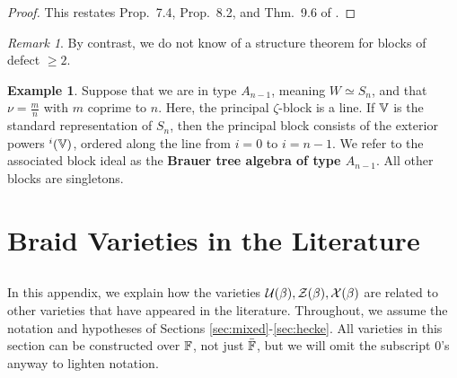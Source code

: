 \documentclass[a4paper,10pt,leqno]{amsart}
\theoremstyle{plain}
\theoremstyle{plain}
\theoremstyle{plain}
\theoremstyle{definition}
\newtheorem{ex}[thm]{Example}
\theoremstyle{remark}
\newtheorem{rem}[thm]{Remark}
\newcommand{\dfemph}[1]{\textbf{#1}}
\let\Alt\relax
\DeclareMathOperator{\Alt}{\text{$\Lambda$}}
\newcommand{\slope}{\nu}
\begin{document}
\begin{proof}
This restates Prop.~7.4, Prop.~8.2, and Thm.~9.6 of \cite{geck}.
\end{proof}

\begin{rem}
By contrast, we do not know of a structure theorem for blocks of defect $\geq 2$.
\end{rem}

\begin{ex}
Suppose that we are in type $A_{n - 1}$, meaning $W \simeq S_n$, and that $\slope = \frac{m}{n}$ with $m$ coprime to $n$.
Here, the principal $\zeta$-block is a line.
If $\bb{V}$ is the standard representation of $S_n$, then the principal block consists of the exterior powers $\Alt^i(\bb{V})$, ordered along the line from $i = 0$ to $i = n - 1$.
We refer to the associated block ideal as the \dfemph{Brauer tree algebra of type $A_{n - 1}$}.
All other blocks are singletons.
\end{ex}

\newpage
\section{Braid Varieties in the Literature}\label{sec:varieties-other}

\subsection{}

In this appendix, we explain how the varieties $\cal{U}(\beta), \cal{Z}(\beta), \cal{X}(\beta)$ are related to other varieties that have appeared in the literature.
Throughout, we assume the notation and hypotheses of Sections \ref{sec:mixed}-\ref{sec:hecke}. 
All varieties in this section can be constructed over $\bb{F}$, not just $\bar{\bb{F}}$, but we will omit the subscript $0$'s anyway to lighten notation.

\subsection{}
\end{document}
